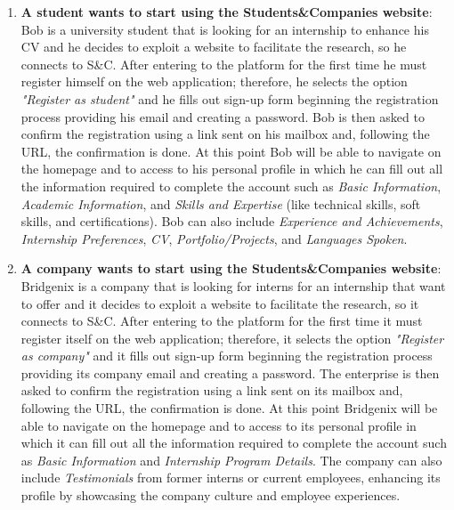 \begin{enumerate}

\item \textbf{A student wants to start using the Students\&Companies website}:
\\Bob is a university student that is looking for an internship to enhance his CV and he decides to exploit a website to facilitate the research, so he connects to S\&C. After entering to the platform for the first time he must register himself on the web application; therefore, he selects the option \textit{"Register as student"} and he fills out sign-up form beginning the registration process providing his email and creating a password. Bob is then asked to confirm the registration using a link sent on his mailbox and, following the URL, the confirmation is done. At this point Bob will be able to navigate on the homepage and to access to his personal profile in which he can fill out all the information required to complete the account such as \textit{Basic Information}, \textit{Academic Information}, and \textit{Skills and Expertise} (like technical skills, soft skills, and certifications). Bob can also include \textit{Experience and Achievements}, \textit{Internship Preferences}, \textit{CV}, \textit{Portfolio/Projects}, and \textit{Languages Spoken}.


\item \textbf{A company wants to start using the Students\&Companies website}:
\\Bridgenix is a company that is looking for interns for an internship that want to offer and it decides to exploit a website to facilitate the research, so it connects to S\&C. After entering to the platform for the first time it must register itself on the web application; therefore, it selects the option \textit{"Register as company"} and it fills out sign-up form beginning the registration process providing its company email and creating a password. The enterprise is then asked to confirm the registration using a link sent on its mailbox and, following the URL, the confirmation is done. At this point Bridgenix will be able to navigate on the homepage and to access to its personal profile in which it can fill out all the information required to complete the account such as \textit{Basic Information} and \textit{Internship Program Details}. The company can also include \textit{Testimonials} from former interns or current employees, enhancing its profile by showcasing the company culture and employee experiences.



\end{enumerate}
